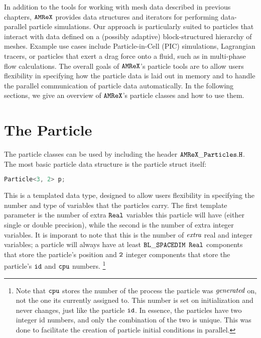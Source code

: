 In addition to the tools for working with mesh data described in previous chapters, $\tt{AMReX}$ provides data structures and iterators for performing data-parallel particle simulations. 
Our approach is particularly suited to particles that interact with data defined on a (possibly adaptive) block-structured hierarchy of meshes. Example use cases include Particle-in-Cell (PIC) simulations, Lagrangian tracers, or particles that exert a drag force onto a fluid, such as in multi-phase flow calculations. The overall goals of $\tt{AMReX}$'s particle 
tools are to allow users flexibility in specifying how the particle data is laid out in memory and to handle the parallel communication of particle data automatically.
In the following sections, we give an overview of $\tt{AMReX}$'s particle classes and how to use them.

\section{The Particle}
\label{sec:Particles:Particle}

The particle classes can be used by including the header $\tt{AMReX\_Particles.H}$. The most basic particle data structure is the particle struct itself: 

\begin{lstlisting}[language=cpp]
  Particle<3, 2> p;
\end{lstlisting}

This is a templated data type, designed to allow users flexibility in specifying the number and type of variables that the particles carry. The first template parameter is
the number of extra $\tt{Real}$ variables this particle will have (either single or double precision), while the second is the number of extra integer variables. It is imporant to note
that this is the number of $\emph{extra}$ real and integer variables; a particle will always have at least $\tt{BL\_SPACEDIM}$ $\tt{Real}$ components that store the particle's position
and $\tt{2}$ integer components that store the particle's $\tt{id}$ and $\tt{cpu}$ numbers.
\footnote{Note that $\tt{cpu}$ stores the number of the process the particle was $\emph{generated}$
on, not the one its currently assigned to. This number is set on initialization and never changes, just like the particle $\tt{id}$. In essence, the particles have two integer id numbers, and only the combination of the two is unique. This was done to facilitate the creation of particle initial conditions in parallel.}

